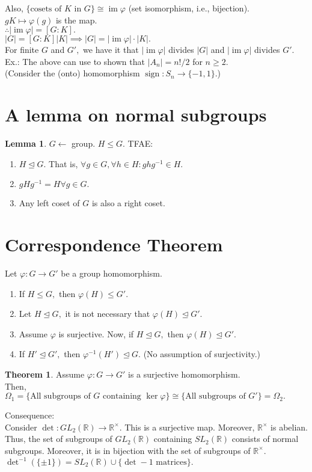 \documentclass[12 pt, a4paper, toc=graduated, oneside]{article}
\theoremstyle{definition}
\newtheorem{theorem}{Theorem}
\newtheorem{lem}{Lemma}
\newcommand{\sign}{\operatorname{sign}}
\newcommand{\im}{\operatorname{im}}
\begin{document}
Also, $\{\text{cosets of }K\text{ in }G\} \cong \im \varphi$ (set isomorphism, i.e., bijection).\\
$gK \mapsto \varphi(g)$ is the map.\\
$\therefore |\im \varphi| = [G:K].$\\
$|G| = [G:K]|K| \implies |G| = |\im \varphi|\cdot|K|.$ \\
For finite $G$ and $G',$ we have it that $|\im\varphi|$ divides $|G|$ and $|\im\varphi|$ divides $G'.$\\
Ex.: The above can use to shown that $|A_n| = n!/2$ for $n \ge 2.$\\
(Consider the (onto) homomorphism $\sign:S_n \to \{-1, 1\}.$)

\section{A lemma on normal subgroups}
\begin{lem}
	$G \longleftarrow$ group. $H \le G.$ TFAE:
	\begin{enumerate}[nosep] 
		\item $H \trianglelefteq G.$ That is, $\forall g \in G, \forall h \in H : ghg^{-1} \in H.$
		\item $gHg^{-1} = H \forall g \in G.$
		\item Any left coset of $G$ is also a right coset.
	\end{enumerate}
\end{lem}

\section{Correspondence Theorem}
Let $\varphi:G \to G'$ be a group homomorphism.
\begin{enumerate}[nosep] 
	\item If $H \le G,$ then $\varphi(H) \le G'.$
	\item Let $H \trianglelefteq G,$ it is not necessary that $\varphi(H) \trianglelefteq G'.$
	\item Assume $\varphi$ is surjective. Now, if $H \trianglelefteq G,$ then $\varphi(H) \trianglelefteq G'.$
	\item If $H' \trianglelefteq G',$ then $\varphi^{-1}(H') \trianglelefteq G.$ \hfill (No assumption of surjectivity.)
\end{enumerate}
\begin{theorem}
	Assume $\varphi : G \to G'$ is a surjective homomorphism.\\
	Then, $\Omega_1 = \{\text{All subgroups of } G \text{ containing } \ker \varphi\} \cong \{\text{All subgroups of }G'\} = \Omega_2.$
\end{theorem}
Consequence:\\
Consider $\det:GL_2(\mathbb{R}) \to \mathbb{R}^\times.$ This is a surjective map. Moreover, $\mathbb{R}^\times$ is abelian.\\
Thus, the set of subgroups of $GL_2(\mathbb{R})$ containing $SL_2(\mathbb{R})$ consists of normal subgroups. Moreover, it is in bijection with the set of subgroups of $\mathbb{R}^\times.$\\
$\det^{-1}(\{\pm1\}) = SL_2(\mathbb{R}) \cup \{\det -1 \text{ matrices}\}.$
\end{document}
